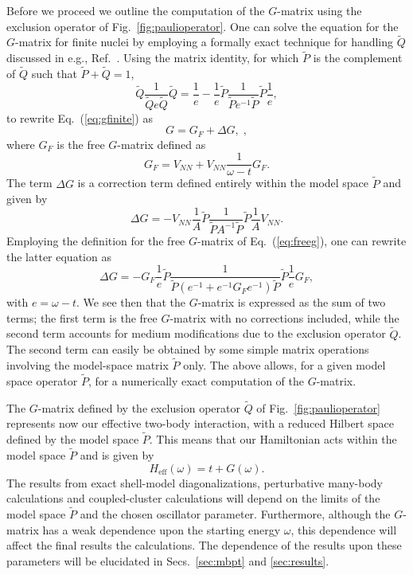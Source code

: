 Before we proceed we outline the computation of the $G$-matrix using the 
exclusion operator of Fig.~\ref{fig:paulioperator}.
One can solve the equation for the $G$-matrix
for finite nuclei by employing
a formally
exact technique for handling $\tilde{Q}$
discussed in e.g., Ref.~\cite{hko95}.
Using the matrix identity, for which $\tilde{P}$ is the complement of 
$\tilde{Q}$ such that $\tilde{P}+\tilde{Q}=1$,
\begin{equation}
  \tilde{Q}\frac{1}{\tilde{Q}e\tilde{Q}}
  \tilde{Q}=\frac{1}{e}-
   \frac{1}{e}\tilde{P}\frac{1}{\tilde{P}e^{-1}\tilde{P}}\tilde{P}\frac{1}{e},
   \label{eq:matrix_relation_q}
\end{equation}
to rewrite Eq.~(\ref{eq:gfinite}) 
as
\begin{equation}
   G = G_{F} +\Delta G,\label{eq:gmod}\;,
\end{equation}
where $G_{F}$ is the free $G$-matrix defined as
\begin{equation}
   G_{F}=V_{NN}+V_{NN}\frac{1}{\omega - t}G_{F}. \label{eq:freeg}
\end{equation}
The term $\Delta G$ is a correction term defined entirely within the
model space $\tilde{P}$ and given by
\begin{equation}
   \Delta G =-V_{NN}\frac{1}{A}\tilde{P}
   \frac{1}{\tilde{P}A^{-1}\tilde{P}}\tilde{P}\frac{1}{A}V_{NN}.
\end{equation}
Employing the definition for the free $G$-matrix of Eq.\ (\ref{eq:freeg}),
one can rewrite the latter equation as
\begin{equation}
  \Delta G =-G_{F}\frac{1}{e}\tilde{P}
  \frac{1}{\tilde{P}(e^{-1}+e^{-1}G_{F}e^{-1})
  \tilde{P}}\tilde{P}\frac{1}{e}G_F,
\end{equation}
with $e=\omega -t$.
We see then that the $G$-matrix 
is expressed as the sum of two
terms; the first term is the free $G$-matrix with no  corrections
included, while the second term accounts for medium modifications
due to the exclusion operator $\tilde{Q}$. The second term can easily
be obtained by some simple matrix operations involving
the model-space matrix $\tilde{P}$ only. The above allows, for a given 
model space operator
$\tilde{P}$, for a numerically  exact computation of the $G$-matrix. 

The $G$-matrix defined by the exclusion operator $\tilde{Q}$
of Fig.~\ref{fig:paulioperator} represents now our effective two-body
interaction, with a reduced Hilbert space defined by the model space
$\tilde{P}$.  This means that our Hamiltonian acts within the model 
space $\tilde{P}$ and is given by 
\begin{equation}
H_{\mathrm{eff}}(\omega) = t+ G(\omega).
\label{eq:finalheff}
\end{equation}
The results from exact shell-model diagonalizations, perturbative
many-body calculations and coupled-cluster calculations will depend
on the limits  of the model space $\tilde{P}$ 
and the chosen oscillator parameter.  Furthermore, although the $G$-matrix has a 
weak dependence upon the starting energy $\omega$, this dependence will affect
the final results the calculations. 
The dependence of the results
upon these  parameters will be elucidated in Secs.~\ref{sec:mbpt} and 
\ref{sec:results}. 

